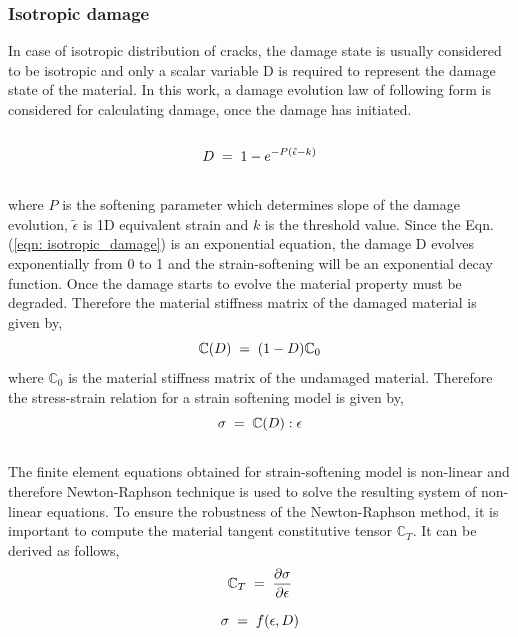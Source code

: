 \documentclass[a4paper,12pt]{extarticle}
\begin{document}
\subsubsection{Isotropic damage}
\indent\indent\indent In case of isotropic distribution of cracks, the damage state is usually considered to be isotropic and only a scalar variable D is required to represent the damage state of the material. In this work, a damage evolution law of following form is considered for calculating damage, once the damage has initiated.\\
\\
\begin{equation}
  \large{ D \; = \; 1 - e^{-P(\tilde{\epsilon} - k)}}
  \label{eqn: isotropic_damage}
\end{equation} 
\\
where $P$ is the softening parameter which determines slope of the damage evolution, $\tilde{\epsilon}$ is 1D equivalent strain  and $k$ is the threshold value. Since the Eqn.(\ref{eqn: isotropic_damage}) is an exponential equation, the damage D evolves exponentially from 0 to 1 and the strain-softening will be an exponential decay function. Once the damage starts to evolve the material property must be degraded. Therefore the material stiffness matrix of the  damaged material is given by,\\
\begin{equation}
\large{\mathbb{C}(D) \; = \; (1  - D) \mathbb{C}_{0} }
\end{equation} 
where $\mathbb{C}_{0}$ is the material stiffness matrix of the undamaged material. Therefore the stress-strain relation for a strain softening model is given by,\\
\begin{equation}
\large{\sigma \; = \; \mathbb{C}(D) : \epsilon }  
\end{equation}
\\
The finite element equations obtained for strain-softening model is non-linear and therefore Newton-Raphson technique is used to solve the resulting system of non-linear equations. To ensure the robustness of the Newton-Raphson method, it is important to compute the material tangent constitutive tensor $\mathbb{C}_{T}$. It can be derived as follows,\\
\begin{equation*}
\large{ \mathbb{C}_{T}  \; = \;\frac{\partial \sigma}{\partial \epsilon}  }
\end{equation*}

\begin{equation*}
\large{\sigma  \; = \; f(\epsilon, D) }
\end{equation*}
\end{document}
